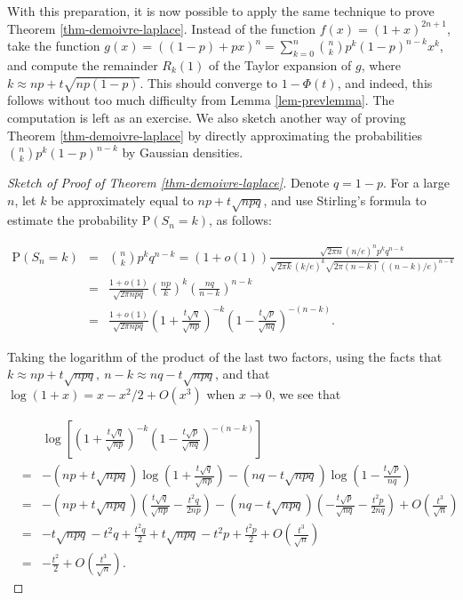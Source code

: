 \documentclass[11pt]{report}
\theoremstyle{plain}
\theoremstyle{definition}
\begin{document}
With this preparation, it is now possible to apply
the same technique to prove Theorem
\ref{thm-demoivre-laplace}. Instead of the function
$f(x)=(1+x)^{2n+1}$, take the function
$g(x)=((1-p) + p x)^n=\sum_{k=0}^n \binom{n}{k} p^k
(1-p)^{n-k} x^k$,
and compute the remainder $R_k(1)$ of the Taylor
expansion of $g$, where
$k \approx np + t \sqrt{np(1-p)}$. This should
converge to $1-\Phi(t)$, and indeed, this follows
without too much difficulty from Lemma
\ref{lem-prevlemma}. The computation is left as an
exercise. We also sketch another way of proving
Theorem \ref{thm-demoivre-laplace} by directly
approximating the probabilities
$\binom{n}{k} p^k (1-p)^{n-k}$ by Gaussian densities.

\begin{proof}[Sketch of Proof of Theorem \ref{thm-demoivre-laplace}]
Denote $q=1-p$. For a large $n$, let $k$ be
approximately equal to $np+t\sqrt{npq}$, and use
Stirling's formula to estimate the probability
$\mathrm{P}(S_n=k)$, as follows:

\begin{eqnarray*}
\mathrm{P}(S_n = k) &=& \binom{n}{k} p^k q^{n-k} = (1+o(1)) \frac{\sqrt{2\pi n} (n/e)^n p^k q^{n-k}}{ \sqrt{2\pi k} (k/e)^k \sqrt{2\pi (n-k)} ((n-k)/e)^{n-k}} \\
&=&  \frac{1+o(1)}{\sqrt{2\pi n p q}} \left(\frac{np}{k}\right)^k \left( \frac{nq}{n-k}\right)^{n-k} \\
&=& \frac{1+o(1)}{\sqrt{2\pi n p q}} \left(1+\frac{t\sqrt{q}}{\sqrt{np}}\right)^{-k} \left(1- \frac{t\sqrt{p}}{\sqrt{nq}}\right)^{-(n-k)}.
\end{eqnarray*}

Taking the logarithm of the product of the last two
factors, using the facts that
$k\approx np+t\sqrt{npq},\ n-k\approx nq-t\sqrt{npq}$,
and that $\log(1+x)=x-x^2/2+O(x^3)$ when $x\to0$, we
see that

\begin{eqnarray*}
&&\log\left[\left(1+\frac{t\sqrt{q}}{\sqrt{np}}\right)^{-k} \left(1- \frac{t\sqrt{p}}{\sqrt{nq}}\right)^{-(n-k)}\right] \\
&=& -(np+t\sqrt{npq}) \log\left(1+\frac{t\sqrt{q}}{\sqrt{np}} \right)
- (nq-t\sqrt{npq}) \log\left(1-\frac{t\sqrt{p}}{nq}\right) \\
&=& -(np+t\sqrt{npq}) \left(\frac{t\sqrt{q}}{\sqrt{np}}-\frac{t^2 q}{2np} \right)
- (nq-t\sqrt{npq}) \left( -\frac{t\sqrt{p}}{\sqrt{nq}} - \frac{t^2 p}{2nq} \right) + O\left(\frac{t^3}{\sqrt{n}}\right) \\
&=& -t\sqrt{npq}  -t^2q + \frac{t^2 q}{2} + t \sqrt{npq} - t^2 p + \frac{t^2 p}{2} + O\left(\frac{t^3}{\sqrt{n}}\right) \\
&=& -\frac{t^2}{2} + O\left(\frac{t^3}{\sqrt{n}}\right).
\end{eqnarray*}


\end{proof}
\end{document}
